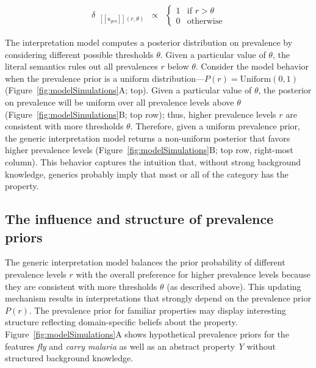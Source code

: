 \documentclass[,man,floatsintext]{apa6}
\theoremstyle{definition}
\theoremstyle{definition}
\theoremstyle{definition}
\theoremstyle{remark}
\begin{document}
\begin{eqnarray}
\delta_{\mbox{ $[\![ u_{gen} ]\!]$}(r, \theta)} &\propto  & \begin{cases}
1 & \text{if } r > \theta \\
0 & \text{otherwise}
\end{cases}\label{eq:delta}
\end{eqnarray}

The interpretation model computes a posterior distribution on prevalence
by considering different possible thresholds \(\theta\). Given a
particular value of \(\theta\), the literal semantics rules out all
prevalences \(r\) below \(\theta\). Consider the model behavior when the
prevalence prior is a uniform
distribution---\(P(r) = \text{Uniform}(0, 1)\)
(Figure~\ref{fig:modelSimulations}A; top). Given a particular value of
\(\theta\), the posterior on prevalence will be uniform over all
prevalence levels above \(\theta\) (Figure~\ref{fig:modelSimulations}B;
top row); thus, higher prevalence levels \(r\) are consistent with more
thresholds \(\theta\). Therefore, given a uniform prevalence prior, the
generic interpretation model returns a non-uniform posterior that favors
higher prevalence levels (Figure~\ref{fig:modelSimulations}B; top row,
right-most column). This behavior captures the intuition that, without
strong background knowledge, generics probably imply that most or all of
the category has the property.

\hypertarget{the-influence-and-structure-of-prevalence-priors}{%
\subsection{The influence and structure of prevalence
priors}\label{the-influence-and-structure-of-prevalence-priors}}

The generic interpretation model balances the prior probability of
different prevalence levels \(r\) with the overall preference for higher
prevalence levels because they are consistent with more thresholds
\(\theta\) (as described above). This updating mechanism results in
interpretations that strongly depend on the prevalence prior \(P(r)\).
The prevalence prior for familiar properties may display interesting
structure reflecting domain-specific beliefs about the property.
Figure~\ref{fig:modelSimulations}A shows hypothetical prevalence priors
for the features \emph{fly} and \emph{carry malaria} as well as an
abstract property \emph{Y} without structured background knowledge.
\end{document}
